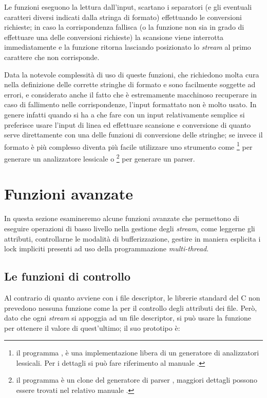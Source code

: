 Le funzioni eseguono la lettura dall'input, scartano i separatori (e gli
eventuali caratteri diversi indicati dalla stringa di formato) effettuando le
conversioni richieste; in caso la corrispondenza fallisca (o la funzione non
sia in grado di effettuare una delle conversioni richieste) la scansione viene
interrotta immediatamente e la funzione ritorna lasciando posizionato lo
\textit{stream} al primo carattere che non corrisponde.

Data la notevole complessità di uso di queste funzioni, che richiedono molta
cura nella definizione delle corrette stringhe di formato e sono facilmente
soggette ad errori, e considerato anche il fatto che è estremamente macchinoso
recuperare in caso di fallimento nelle corrispondenze, l'input formattato non
è molto usato. In genere infatti quando si ha a che fare con un input
relativamente semplice si preferisce usare l'input di linea ed effettuare
scansione e conversione di quanto serve direttamente con una delle funzioni di
conversione delle stringhe; se invece il formato è più complesso diventa più
facile utilizzare uno strumento come \footnote{il programma
  , è una implementazione libera di  un generatore di
  analizzatori lessicali. Per i dettagli si può fare riferimento al manuale
  \cite{flex}.} per generare un analizzatore lessicale o 
\footnote{il programma  è un clone del generatore di
  parser , maggiori dettagli possono essere trovati nel relativo
  manuale \cite{bison}.} per generare un parser.



\section{Funzioni avanzate}
\label{sec:file_stream_adv_func}

In questa sezione esamineremo alcune funzioni avanzate che permettono di
eseguire operazioni di basso livello nella gestione degli \textit{stream},
come leggerne gli attributi, controllarne le modalità di bufferizzazione,
gestire in maniera esplicita i lock impliciti presenti ad uso della
programmazione \textit{multi-thread}.


\subsection{Le funzioni di controllo}
\label{sec:file_stream_cntrl}

Al contrario di quanto avviene con i file descriptor, le librerie standard del
C non prevedono nessuna funzione come la  per il controllo degli
attributi dei file. Però, dato che ogni \textit{stream} si appoggia ad un file
descriptor, si può usare la funzione  per ottenere il valore di
quest'ultimo; il suo prototipo è:

